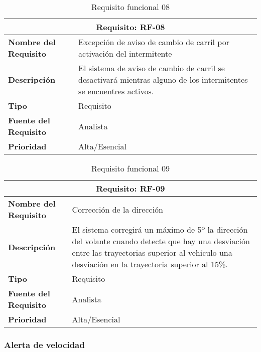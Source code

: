 \begin{table}[H]
\begin{center}
\begin{tabular}{p{} p{7cm}}
\multicolumn{2}{c}{\textbf{Requisito: RF-08} } \\
\hline \hline
\textbf{Nombre del Requisito} &  Excepción de aviso de cambio de carril por activación del intermitente\\
\hline
\textbf{Descripción} & El sistema de aviso de cambio de carril se desactivará mientras alguno de los intermitentes se encuentres activos. \\
\hline
\textbf{Tipo} & Requisito  \\
\hline
\textbf{Fuente del Requisito} & Analista  \\
\hline
\textbf{Prioridad} & Alta/Esencial  \\ \hline
\end{tabular}
\caption{Requisito funcional 08}
\label{tab:RF-08}
\end{center}
\end{table}

\begin{table}[H]
\begin{center}
\begin{tabular}{p{} p{7cm}}
\multicolumn{2}{c}{\textbf{Requisito: RF-09} } \\
\hline \hline
\textbf{Nombre del Requisito} &  Corrección de la dirección \\
\hline
\textbf{Descripción} & El sistema corregirá un máximo de 5º la dirección del volante cuando detecte que hay una desviación entre las trayectorias superior al vehículo una desviación en la trayectoria superior al 15\%. \\
\hline
\textbf{Tipo} & Requisito  \\
\hline
\textbf{Fuente del Requisito} & Analista  \\
\hline
\textbf{Prioridad} & Alta/Esencial  \\ \hline
\end{tabular}
\caption{Requisito funcional 09}
\label{tab:RF-09}
\end{center}
\end{table}

\newpage

\subsubsection{Alerta de velocidad}

